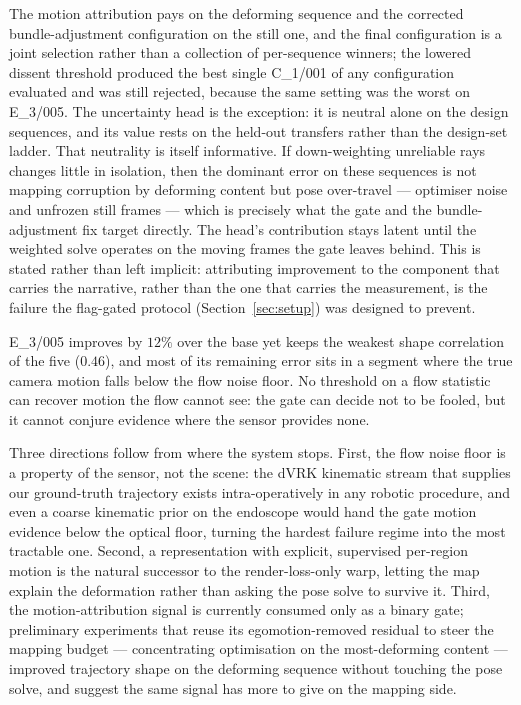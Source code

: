 \documentclass{article}
\begin{document}
The motion attribution pays on the deforming sequence and the corrected bundle-adjustment configuration on the still one, and the final configuration is a joint selection rather than a collection of per-sequence winners; the lowered dissent threshold produced the best single C\_1/001 of any configuration evaluated and was still rejected, because the same setting was the worst on E\_3/005. The uncertainty head is the exception: it is neutral alone on the design sequences, and its value rests on the held-out transfers rather than the design-set ladder. That neutrality is itself informative. If down-weighting unreliable rays changes little in isolation, then the dominant error on these sequences is not mapping corruption by deforming content but pose over-travel --- optimiser noise and unfrozen still frames --- which is precisely what the gate and the bundle-adjustment fix target directly. The head's contribution stays latent until the weighted solve operates on the moving frames the gate leaves behind. This is stated rather than left implicit: attributing improvement to the component that carries the narrative, rather than the one that carries the measurement, is the failure the flag-gated protocol (Section~\ref{sec:setup}) was designed to prevent.

E\_3/005 improves by $12\%$ over the base yet keeps the weakest shape correlation of the five ($0.46$), and most of its remaining error sits in a segment where the true camera motion falls below the flow noise floor. No threshold on a flow statistic can recover motion the flow cannot see: the gate can decide not to be fooled, but it cannot conjure evidence where the sensor provides none.

Three directions follow from where the system stops. First, the flow noise floor is a property of the sensor, not the scene: the dVRK kinematic stream that supplies our ground-truth trajectory exists intra-operatively in any robotic procedure, and even a coarse kinematic prior on the endoscope would hand the gate motion evidence below the optical floor, turning the hardest failure regime into the most tractable one. Second, a representation with explicit, supervised per-region motion is the natural successor to the render-loss-only warp, letting the map explain the deformation rather than asking the pose solve to survive it. Third, the motion-attribution signal is currently consumed only as a binary gate; preliminary experiments that reuse its egomotion-removed residual to steer the mapping budget --- concentrating optimisation on the most-deforming content --- improved trajectory shape on the deforming sequence without touching the pose solve, and suggest the same signal has more to give on the mapping side.
\end{document}
